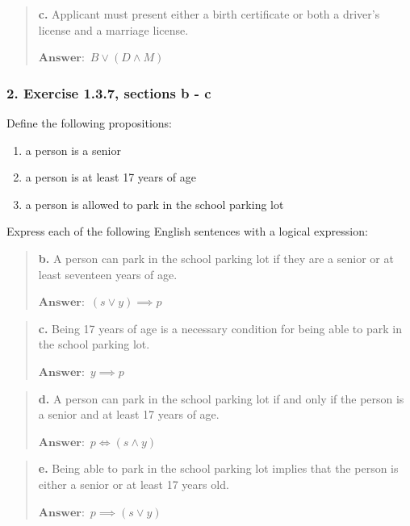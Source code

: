 \documentclass[11pt, oneside]{article}
\begin{document}
\begin{quote}
    \textbf{c. }Applicant must present either a birth certificate or both a driver's license and a marriage license.

    \(\textbf{Answer:}\enspace B \lor (D \land M)\)
\end{quote}

\subsubsection*{2. Exercise 1.3.7, sections b - c}

Define the following propositions:

\begin{enumerate}
    \item[s:] a person is a senior
    \item[y:] a person is at least 17 years of age
    \item[p:] a person is allowed to park in the school parking lot
\end{enumerate}

Express each of the following English sentences with a logical expression:

\begin{quote}
    \textbf{b. }A person can park in the school parking lot if they are a senior or at least seventeen years of age.

    \(\textbf{Answer:}\enspace(s \lor y) \implies p\)
\end{quote}

\begin{quote}
    \textbf{c. }Being 17 years of age is a necessary condition for being able to park in the school parking lot.

    \(\textbf{Answer:}\enspace y \implies p\)
\end{quote}

\begin{quote}
    \textbf{d. }A person can park in the school parking lot if and only if the person is a senior and at least 17 years of age.

    \(\textbf{Answer:}\enspace p \iff (s \land y)\)
\end{quote}

\begin{quote}
    \textbf{e. }Being able to park in the school parking lot implies that the person is either a senior or at least 17 years old.

    \(\textbf{Answer:}\enspace p \implies (s \lor y)\)
\end{quote}
\end{document}
